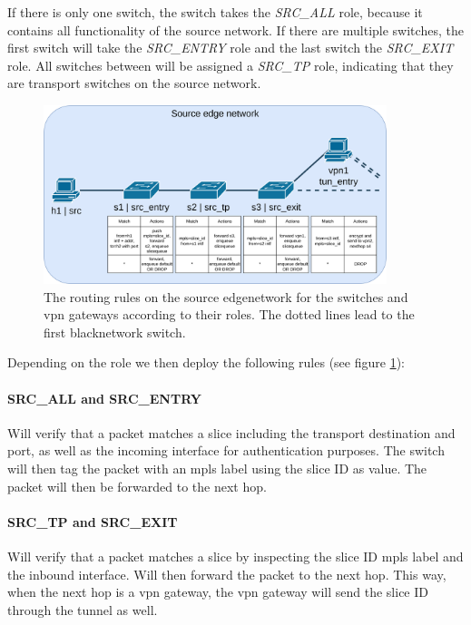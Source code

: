 If there is only one switch, the switch takes the \textit{SRC\_ALL} role, because it contains all functionality of the source network. If there are multiple switches, the first switch will take the \textit{SRC\_ENTRY} role and the last switch the \textit{SRC\_EXIT} role. All switches between will be assigned a \textit{SRC\_TP} role, indicating that they are transport switches on the source network.

\begin{figure}[ht]
    \centering
    \includegraphics[width=10cm]{images/chapter_6/routing_source.png}
    \caption[Routing on the source \gls{edgenetwork}]{The routing rules on the source \gls{edgenetwork} for the switches and \acrshort{vpn} gateways according to their roles. The dotted lines lead to the first \gls{blacknetwork} switch.}
    \label{fig:routing_source}
\end{figure}

Depending on the role we then deploy the following rules (see figure \ref{fig:routing_source}):

\paragraph{SRC\_ALL and SRC\_ENTRY} Will verify that a packet matches a slice including the transport destination and port, as well as the incoming interface for authentication purposes. The switch will then tag the packet with an \acrshort{mpls} label using the slice ID as value. The packet will then be forwarded to the next hop.

\paragraph{SRC\_TP and SRC\_EXIT} Will verify that a packet matches a slice by inspecting the slice ID \acrshort{mpls} label and the inbound interface. Will then forward the packet to the next hop. This way, when the next hop is a \acrshort{vpn} gateway, the \acrshort{vpn} gateway will send the slice ID through the tunnel as well.

